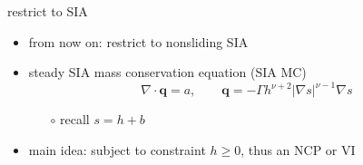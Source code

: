 \documentclass[xcolor={dvipsnames}]{beamer}
\newcommand\bq{\mathbf{q}}
\newcommand\Div{\nabla\cdot}
\newcommand\grad{\nabla}
\begin{document}
\begin{frame}{restrict to SIA}

\begin{itemize}
\item from now on: restrict to nonsliding SIA
\item steady SIA mass conservation equation (SIA MC)
    $$\Div \bq = a, \qquad \bq = - \Gamma h^{\nu+2} |\grad s|^{\nu-1} \grad s$$

\vspace{-2mm}
    \begin{itemize}
    \item[$\circ$] recall $s=h+b$
    \end{itemize}
\item main idea: \alert{subject to constraint $h\ge 0$, thus an NCP or VI}
\end{itemize}
\end{frame}
\end{document}
